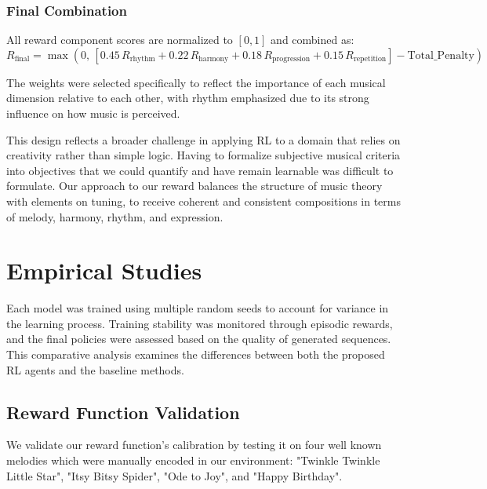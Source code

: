 \documentclass{article}
\begin{document}
\subsubsection{Final Combination}

All reward component scores are normalized to $[0,1]$ and combined as:\\
\vspace{-4pt}
\[
R_{\text{final}} = \max\left( 0,\, [0.45\,R_{\text{rhythm}} +
0.22\,R_{\text{harmony}} +
0.18\,R_{\text{progression}} +
0.15\,R_{\text{repetition}}] - \text{Total\_Penalty} \right)
\]

The weights were selected specifically to reflect the importance of each musical dimension relative to each other, with rhythm emphasized due to its strong influence on how music is perceived.

This design reflects a broader challenge in applying RL to a domain that relies on creativity rather than simple logic. Having to formalize subjective musical criteria into objectives that we could quantify and have remain learnable was difficult to formulate. Our approach to our reward balances the structure of music theory with elements on tuning, to receive coherent and consistent compositions in terms of melody, harmony, rhythm, and expression.

\section{Empirical Studies}

Each model was trained using multiple random seeds to account for variance in the learning process. Training stability was monitored through episodic rewards, and the final policies were assessed based on the quality of generated sequences. This comparative analysis examines the differences between both the proposed RL agents and the baseline methods.

\subsection{Reward Function Validation}

We validate our reward function's calibration by testing it on four well known melodies which were manually encoded in our environment: "Twinkle Twinkle Little Star", "Itsy Bitsy Spider", "Ode to Joy", and "Happy Birthday". 
\end{document}
